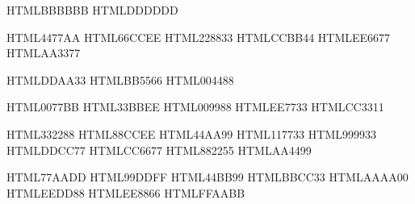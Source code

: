 \definecolor{TolGray}      {HTML}{BBBBBB}
\definecolor{TolPaleGray}  {HTML}{DDDDDD}

\definecolor{TolBriBlue}   {HTML}{4477AA}
\definecolor{TolBriCyan}   {HTML}{66CCEE}
\definecolor{TolBriGreen}  {HTML}{228833}
\definecolor{TolBriYellow} {HTML}{CCBB44}
\definecolor{TolBriRed}    {HTML}{EE6677}
\definecolor{TolBriPurple} {HTML}{AA3377}

\definecolor{TolHCYellow}  {HTML}{DDAA33}
\definecolor{TolHCRed}     {HTML}{BB5566}
\definecolor{TolHCBlue}    {HTML}{004488}

\definecolor{TolVibBlue}   {HTML}{0077BB}
\definecolor{TolVibCyan}   {HTML}{33BBEE}
\definecolor{TolVibTeal}   {HTML}{009988}
\definecolor{TolVibOrange} {HTML}{EE7733}
\definecolor{TolVibRed}    {HTML}{CC3311}

\definecolor{TolMutIndigo} {HTML}{332288}
\definecolor{TolMutCyan}   {HTML}{88CCEE}
\definecolor{TolMutTeal}   {HTML}{44AA99}
\definecolor{TolMutGreen}  {HTML}{117733}
\definecolor{TolMutOlive}  {HTML}{999933}
\definecolor{TolMutSand}   {HTML}{DDCC77}
\definecolor{TolMutRose}   {HTML}{CC6677}
\definecolor{TolMutWine}   {HTML}{882255}
\definecolor{TolMutPurple} {HTML}{AA4499}

\definecolor{TolLigBlue}   {HTML}{77AADD}
\definecolor{TolLigCyan}   {HTML}{99DDFF}
\definecolor{TolLigMint}   {HTML}{44BB99}
\definecolor{TolLigPear}   {HTML}{BBCC33}
\definecolor{TolLigOlive}  {HTML}{AAAA00}
\definecolor{TolLigYellow} {HTML}{EEDD88}
\definecolor{TolLigOrange} {HTML}{EE8866}
\definecolor{TolLigPink}   {HTML}{FFAABB}
